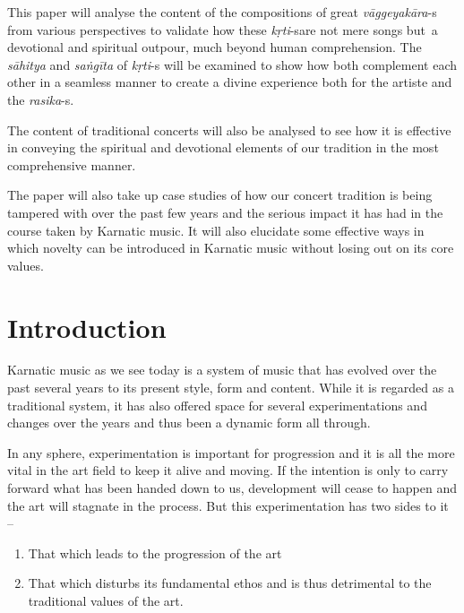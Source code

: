 This paper will analyse the content of the compositions of great \textit{vāggeyakāra}-s from various perspectives to validate how these \textit{kṛti}-s\break are not mere songs but a devotional and spiritual outpour, much beyond human comprehension. The \textit{sāhitya} and \textit{saṅgīta} of \textit{kṛti}-s will be examined to show how both complement each other in a seamless manner to create a divine experience both for the artiste and the \textit{rasika}-s.

The content of traditional concerts will also be analysed to see how it is effective in conveying the spiritual and devotional elements of our tradition in the most comprehensive manner.

The paper will also take up case studies of how our concert tradition is being tampered with over the past few years and the serious impact it has had in the course taken by Karnatic music. It will also elucidate some effective ways in which novelty can be introduced in Karnatic music without losing out on its core values.


\section*{Introduction}

Karnatic music as we see today is a system of music that has evolved over the past several years to its present style, form and content. While it is regarded as a traditional system, it has also offered space for several experimentations and changes over the years and thus been a dynamic form all through.

In any sphere, experimentation is important for progression and it is all the more vital in the art field to keep it alive and moving. If the intention is only to carry forward what has been handed down to us, development will cease to happen and the art will stagnate in the process. But this experimentation has two sides to it –

\vspace{-.3cm}

\begin{enumerate}
\itemsep=0pt

 \item That which leads to the progression of the art

 \item That which disturbs its fundamental ethos and is thus detrimental to the traditional values of the art.

\end{enumerate}

